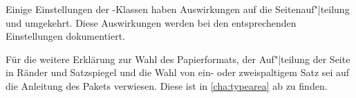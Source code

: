 Einige Einstellungen der \KOMAScript{}-Klassen haben Auswirkungen auf die
Seitenauf"|teilung und umgekehrt. Diese Auswirkungen werden bei den
entsprechenden Einstellungen dokumentiert.

Für die weitere Erklärung zur Wahl des Papierformats, der Auf"|teilung der Seite
in Ränder und Satzspiegel und die Wahl von ein- oder zweispaltigem Satz sei
auf die Anleitung des Pakets  verwiesen. Diese ist in
\autoref{cha:typearea} ab  zu finden.



